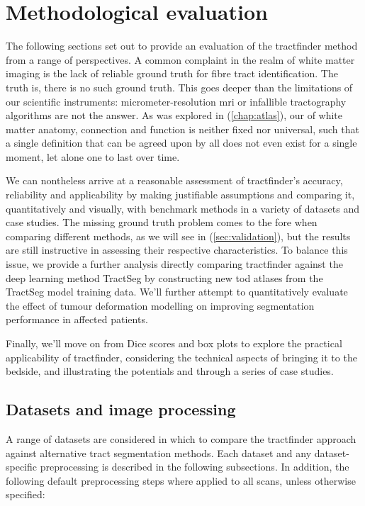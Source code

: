 \chapter{Methodological evaluation}

The following sections set out to provide an evaluation of the tractfinder method from a range of perspectives.
A common complaint in the realm of white matter imaging is the lack of reliable ground truth for fibre tract identification.
The truth is, there is no such ground truth.
This goes deeper than the limitations of our scientific instruments: micrometer-resolution \gls{mri} or infallible tractography algorithms are not the answer.
As was explored in (\ref{chap:atlas}), our  of white matter anatomy, connection and function is neither fixed nor universal, such that a single definition that can be agreed upon by all does not even exist for a single moment, let alone one to last over time.

We can nontheless arrive at a reasonable assessment of tractfinder's accuracy, reliability and applicability by making justifiable assumptions and comparing it, quantitatively and visually, with benchmark methods in a variety of datasets and case studies.
The missing ground truth problem comes to the fore when comparing different methods, as we will see in (\ref{sec:validation}), but the results are still instructive in assessing their respective characteristics.
To balance this issue, we provide a further analysis directly comparing tractfinder against the deep learning method TractSeg by constructing new \gls{tod} atlases from the TractSeg model training data.
We'll further attempt to quantitatively evaluate the effect of tumour deformation modelling on improving segmentation performance in affected patients.

Finally, we'll move on from Dice scores and box plots to explore the practical applicability of tractfinder, considering the technical aspects of bringing it to the bedside, and illustrating the potentials and  through a series of case studies.

\section{Datasets and image processing}
\label{sec:data}

A range of datasets are considered in which to compare the tractfinder approach against alternative tract segmentation methods.
Each dataset and any dataset-specific preprocessing is described in the following subsections.
In addition, the following default preprocessing steps where applied to all scans, unless otherwise specified:

